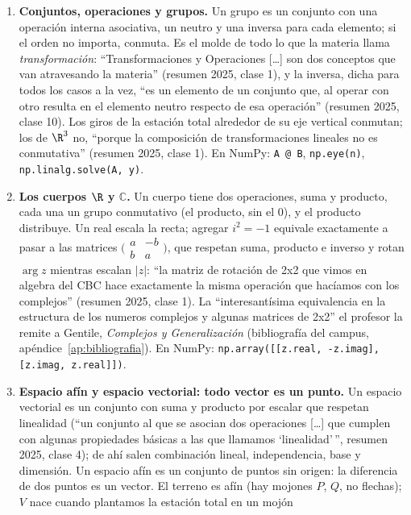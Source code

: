 \begin{enumerate}
  \item \textbf{Conjuntos, operaciones y grupos.} Un grupo es un conjunto con una
  operación interna asociativa, un neutro y una inversa para cada elemento; si el orden no
  importa, conmuta. Es el molde de todo lo que la materia llama \emph{transformación}:
  ``Transformaciones y Operaciones [\ldots] son dos conceptos que van atravesando la
  materia'' (resumen 2025, clase 1), y la inversa, dicha para todos los casos a la vez,
  ``es un elemento de un conjunto que, al operar con otro resulta en el elemento neutro
  respecto de esa operación'' (resumen 2025, clase 10). Los giros de la estación total
  alrededor de su eje vertical conmutan; los de \(\R^3\) no, ``porque la composición de
  transformaciones lineales no es conmutativa'' (resumen 2025, clase 1). En NumPy:
  \texttt{A @ B}, \texttt{np.eye(n)}, \texttt{np.linalg.solve(A, y)}.
  \item \textbf{Los cuerpos \(\R\) y \(\mathbb{C}\).} Un cuerpo tiene dos operaciones, suma
  y producto, cada una un grupo conmutativo (el producto, sin el \(0\)), y el producto
  distribuye. Un real escala la recta; agregar \(i^2=-1\) equivale exactamente a pasar a las
  matrices \(\bigl(\begin{smallmatrix}a&-b\\ b&a\end{smallmatrix}\bigr)\), que respetan
  suma, producto e inverso y rotan \(\arg z\) mientras escalan \(|z|\): ``la matriz de
  rotación de 2x2 que vimos en algebra del CBC hace exactamente la misma operación que
  hacíamos con los complejos'' (resumen 2025, clase 1). La ``interesantísima equivalencia
  en la estructura de los numeros complejos y algunas matrices de 2x2'' el profesor la
  remite a Gentile, \emph{Complejos y Generalización} (bibliografía del campus,
  apéndice~\ref{ap:bibliografia}). En NumPy:
  \texttt{np.array([[z.real, -z.imag], [z.imag, z.real]])}.
  \item \textbf{Espacio afín y espacio vectorial: todo vector es un punto.} Un espacio
  vectorial es un conjunto con suma y producto por escalar que respetan linealidad (``un
  conjunto al que se asocian dos operaciones [\ldots] que cumplen con algunas propiedades
  básicas a las que llamamos `linealidad'\,'', resumen 2025, clase 4); de ahí salen
  combinación lineal, independencia, base y dimensión. Un espacio afín es un conjunto de
  puntos sin origen: la diferencia de dos puntos es un vector. El terreno es afín (hay
  mojones \(P\), \(Q\), no flechas); \(V\) nace cuando plantamos la estación total en un mojón

\end{enumerate}
